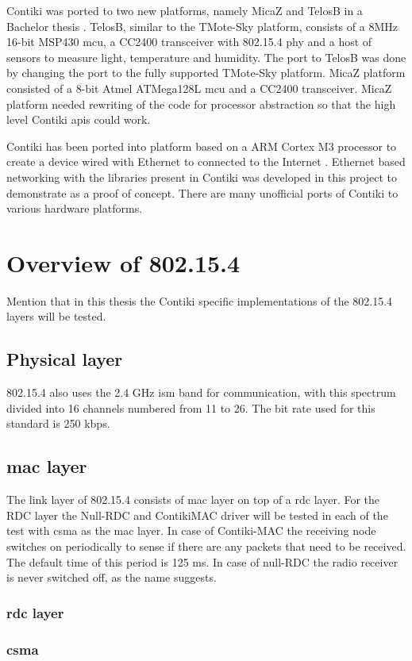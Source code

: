 Contiki was ported to two new platforms, namely MicaZ and TelosB in a Bachelor thesis \cite{stan2007porting}. TelosB, similar to the TMote-Sky platform, consists of a 8MHz 16-bit MSP430 \gls{mcu}, a CC2400 transceiver with 802.15.4 \gls{phy} and a host of sensors to measure light, temperature and humidity. The port to TelosB was done by changing the port to the fully supported TMote-Sky platform. MicaZ platform consisted of a 8-bit Atmel ATMega128L \gls{mcu} and a CC2400 transceiver. MicaZ platform needed rewriting of the code for processor abstraction so that the high level Contiki \glspl{api} could work.

Contiki has been ported into platform based on a ARM Cortex M3 processor to create a device wired with Ethernet to connected to the Internet \cite{Wilde2013a}. Ethernet based networking with the libraries present in Contiki was developed in this project to demonstrate as a proof of concept. There are many unofficial ports of Contiki to various hardware platforms.

\section{Overview of 802.15.4} \label{Overview15.4}
Mention that in this thesis the Contiki specific implementations of the 802.15.4 layers will be tested.

\subsection{Physical layer}
802.15.4 also uses the 2.4 GHz \gls{ism} band for communication, with this spectrum divided into 16 channels numbered from 11 to 26. The bit rate used for this standard is 250 kbps.

\subsection{\gls{mac} layer}

The link layer of 802.15.4 consists of \gls{mac} layer on top of a \gls{rdc} layer. For the RDC layer the Null-RDC and ContikiMAC driver will be tested in each of the test with \gls{csma} as the \gls{mac} layer. In case of Contiki-MAC the receiving node switches on periodically to sense if there are any packets that need to be received. The default time of this period is 125 ms. In case of null-RDC the radio receiver is never switched off, as the name suggests.


\subsubsection{\gls{rdc} layer}
\subsubsection{\gls{csma}}


